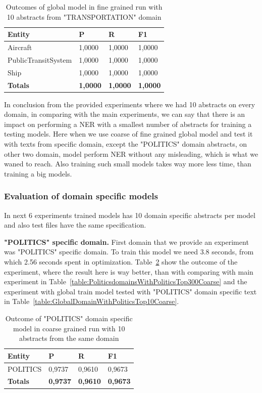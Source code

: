 \documentclass[thesis=M,english]{FITthesis}[2018/05/30]
\begin{document}
	\begin{table}[H]\centering
		\begin{tabular}{|l|l|l|l|}
			\hline {\textbf{Entity}} & {\textbf{P}} & {\textbf{R}} & {\textbf{F1}}\\\hline
				Aircraft & 1,0000 & 1,0000 & 1,0000\\
				PublicTransitSystem & 1,0000 & 1,0000 & 1,0000\\
				Ship & 1,0000 & 1,0000 & 1,0000\\\hline
				\textbf{Totals} & \textbf{1,0000} & \textbf{1,0000} & \textbf{1,0000}\\\hline
		\end{tabular}
		\caption{Outcomes of global model in fine grained run with 10 abstracts from "TRANSPORTATION" domain \label{table:GlobalDomainWithTransportationTop10Fine}}		
	\end{table}
	
	In conclusion from the provided experiments where we had 10 abstracts on every domain, in comparing with the main experiments, we can say that there is an impact on performing a NER with a smallest number of abstracts for training a testing models. Here when we use coarse of fine grained global model and test it with texts from specific domain, except the "POLITICS" domain abstracts, on other two domain, model perform NER without any misleading, which is what we waned to reach. Also training such small models takes way more less time, than training a big models. 
 
 \subsubsection{Evaluation of domain specific models}
	In next 6 experiments trained models has 10 domain specific abstracts per model and also test files have the same specification.
	
	\textbf{"POLITICS" specific domain.} First domain that we provide an experiment was "POLITICS" specific domain. To train this model we need 3.8 seconds, from which 2.56 seconds spent in optimization. Table~\ref{table:PoliticsDomainWithPoliticsTop10Coarse} show the outcome of the experiment, where the result here is way better, than with comparing with main experiment in Table~\ref{table:PoliticsdomainsWithPoliticsTop300Coarse} and the experiment with global train model tested with "POLITICS" domain specific text in Table~\ref{table:GlobalDomainWithPoliticsTop10Coarse}.  

	\begin{table}[H]\centering
		\begin{tabular}{|l|l|l|l|}
			\hline {\textbf{Entity}} & {\textbf{P}} & {\textbf{R}} & {\textbf{F1}}\\\hline
				POLITICS & 0,9737 & 0,9610 & 0,9673\\\hline
				\textbf{Totals} & \textbf{0,9737} & \textbf{0,9610} & \textbf{0,9673}\\\hline
		\end{tabular}
		\caption{Outcome of "POLITICS" domain specific model in coarse grained run with 10 abstracts from the same domain \label{table:PoliticsDomainWithPoliticsTop10Coarse}}
	\end{table}	
	
\end{document}
